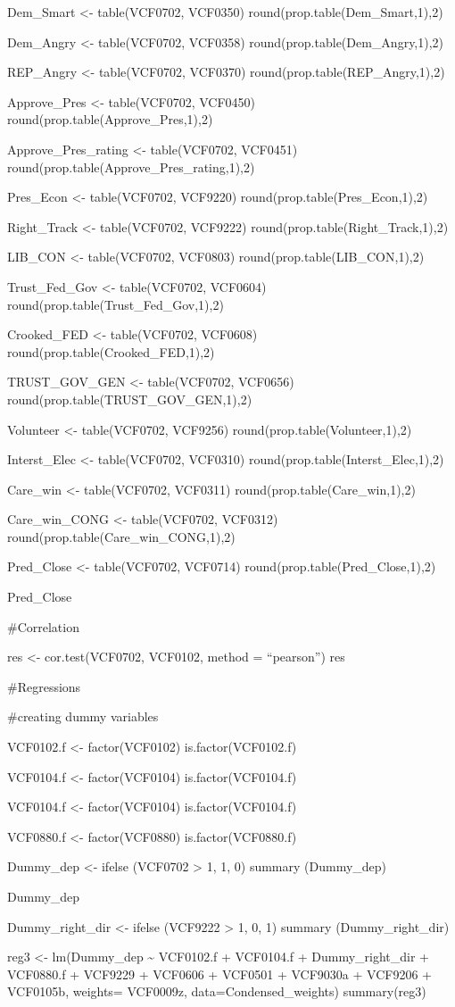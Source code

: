 \documentclass[
]{article}
\begin{document}
Dem\_Smart \textless- table(VCF0702, VCF0350)
round(prop.table(Dem\_Smart,1),2)

Dem\_Angry \textless- table(VCF0702, VCF0358)
round(prop.table(Dem\_Angry,1),2)

REP\_Angry \textless- table(VCF0702, VCF0370)
round(prop.table(REP\_Angry,1),2)

Approve\_Pres \textless- table(VCF0702, VCF0450)
round(prop.table(Approve\_Pres,1),2)

Approve\_Pres\_rating \textless- table(VCF0702, VCF0451)
round(prop.table(Approve\_Pres\_rating,1),2)

Pres\_Econ \textless- table(VCF0702, VCF9220)
round(prop.table(Pres\_Econ,1),2)

Right\_Track \textless- table(VCF0702, VCF9222)
round(prop.table(Right\_Track,1),2)

LIB\_CON \textless- table(VCF0702, VCF0803)
round(prop.table(LIB\_CON,1),2)

Trust\_Fed\_Gov \textless- table(VCF0702, VCF0604)
round(prop.table(Trust\_Fed\_Gov,1),2)

Crooked\_FED \textless- table(VCF0702, VCF0608)
round(prop.table(Crooked\_FED,1),2)

TRUST\_GOV\_GEN \textless- table(VCF0702, VCF0656)
round(prop.table(TRUST\_GOV\_GEN,1),2)

Volunteer \textless- table(VCF0702, VCF9256)
round(prop.table(Volunteer,1),2)

Interst\_Elec \textless- table(VCF0702, VCF0310)
round(prop.table(Interst\_Elec,1),2)

Care\_win \textless- table(VCF0702, VCF0311)
round(prop.table(Care\_win,1),2)

Care\_win\_CONG \textless- table(VCF0702, VCF0312)
round(prop.table(Care\_win\_CONG,1),2)

Pred\_Close \textless- table(VCF0702, VCF0714)
round(prop.table(Pred\_Close,1),2)

Pred\_Close

\#Correlation

res \textless- cor.test(VCF0702, VCF0102, method = ``pearson'') res

\#Regressions

\#creating dummy variables

VCF0102.f \textless- factor(VCF0102) is.factor(VCF0102.f)

VCF0104.f \textless- factor(VCF0104) is.factor(VCF0104.f)

VCF0104.f \textless- factor(VCF0104) is.factor(VCF0104.f)

VCF0880.f \textless- factor(VCF0880) is.factor(VCF0880.f)

Dummy\_dep \textless- ifelse (VCF0702 \textgreater{} 1, 1, 0) summary
(Dummy\_dep)

Dummy\_dep

Dummy\_right\_dir \textless- ifelse (VCF9222 \textgreater{} 1, 0, 1)
summary (Dummy\_right\_dir)

reg3 \textless- lm(Dummy\_dep \textasciitilde{} VCF0102.f + VCF0104.f +
Dummy\_right\_dir + VCF0880.f + VCF9229 + VCF0606 + VCF0501 + VCF9030a +
VCF9206 + VCF0105b, weights= VCF0009z, data=Condensed\_weights)
summary(reg3)
\end{document}
